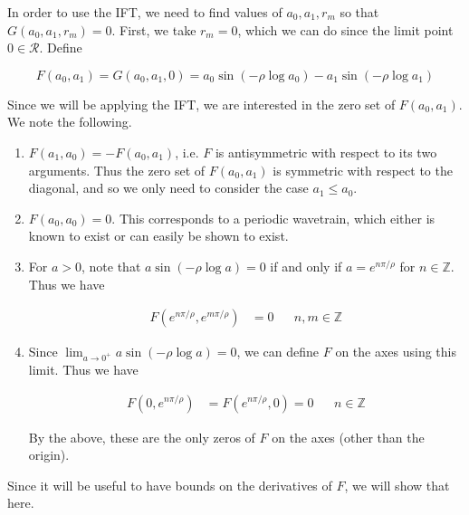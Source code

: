 \documentclass[12pt]{article}
\def\Z{{\mathbb Z}}
\begin{document}
In order to use the IFT, we need to find values of $a_0, a_1, r_m$ so that $G(a_0, a_1, r_m) = 0$. First, we take $r_m = 0$, which we can do since the limit point $0 \in \mathcal{R}$. Define

\begin{equation}\label{defF}
F(a_0, a_1) = G(a_0, a_1, 0) = 
a_0 \sin \left( -\rho \log a_0 \right) - a_1 \sin \left( -\rho \log a_1 \right)
\end{equation}

Since we will be applying the IFT, we are interested in the zero set of $F(a_0, a_1)$. We note the following.

\begin{enumerate}
	\item $F(a_1, a_0) = -F(a_0, a_1)$, i.e. $F$ is antisymmetric with respect to its two arguments. Thus the zero set of $F(a_0, a_1)$ is symmetric with respect to the diagonal, and so we only need to consider the case $a_1 \leq a_0$.

	\item $F(a_0, a_0) = 0$. This corresponds to a periodic wavetrain, which either is known to exist or can easily be shown to exist.

	\item For $a > 0$, note that $a \sin \left( -\rho \log a \right) = 0$ if and only if $a = e^{n \pi / \rho}$ for $n \in \Z$. Thus we have

	\begin{align*}
	F(e^{n \pi / \rho}, e^{m \pi / \rho}) &= 0 && n, m \in \Z
	\end{align*}

    \item Since $\lim_{a \rightarrow 0^+} a \sin \left( -\rho \log a \right) = 0$, we can define $F$ on the axes using this limit. Thus we have

    \begin{align*}
	F(0, e^{n \pi / \rho}) &= F(e^{n \pi / \rho}, 0) = 0 && n \in \Z
	\end{align*}

	By the above, these are the only zeros of $F$ on the axes (other than the origin).
\end{enumerate}

Since it will be useful to have bounds on the derivatives of $F$, we will show that here.

\end{document}
